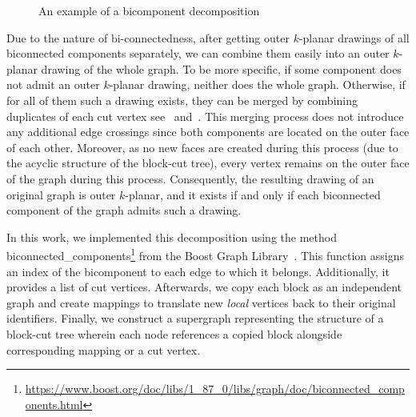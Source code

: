 \begin{figure}[tbh]
    \centering
    \hfill
    \hfill
    \hfill
    \caption{An example of a bicomponent decomposition}
\end{figure}

Due to the nature of bi-connectedness, after getting outer \(k\)-planar drawings of all biconnected components separately, we can combine them easily into an outer \(k\)-planar drawing of the whole graph. To be more specific, if some component does not admit an outer \(k\)-planar drawing, neither does the whole graph. Otherwise, if for all of them such a drawing exists, they can be merged by combining duplicates of each cut vertex see~ and~. This merging process does not introduce any additional edge crossings since both components are located on the outer face of each other. Moreover, as no new faces are created during this process (due to the acyclic structure of the block-cut tree), every vertex remains on the outer face of the graph during this process. Consequently, the resulting drawing of an original graph is outer \(k\)-planar, and it exists if and only if each biconnected component of the graph admits such a drawing.

In this work, we implemented this decomposition using the method \textsf{bi\-connec\-ted\_compo\-nents}\footnote{\url{https://www.boost.org/doc/libs/1_87_0/libs/graph/doc/biconnected_components.html}} from the Boost Graph Library~\cite{boost}. This function assigns an index of the bicomponent to each edge to which it belongs. Additionally, it provides a list of cut vertices. Afterwards, we copy each block as an independent graph and create mappings to translate new \emph{local} vertices back to their original identifiers. Finally, we construct a supergraph representing the structure of a block-cut tree wherein each node references a copied block alongside corresponding mapping or a cut vertex.

